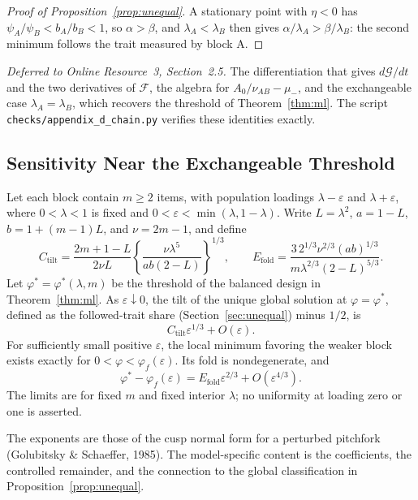 \begin{proof}[Proof of Proposition~\ref{prop:unequal}]
A stationary point with $\eta<0$ has $\psi_A/\psi_B<b_A/b_B<1$, so $\alpha>\beta$, and $\lambda_A<\lambda_B$ then gives $\alpha/\lambda_A>\beta/\lambda_B$: the second minimum follows the trait measured by block A.
\end{proof}

\textit{Deferred to Online Resource~3, Section~2.5.} The differentiation that gives $d\mathcal G/dt$ and the two derivatives of $\mathcal F$, the algebra for $A_0/\nu_{AB}-\mu_-$, and the exchangeable case $\lambda_A=\lambda_B$, which recovers the threshold of Theorem~\ref{thm:ml}. The script \texttt{checks/appendix\_d\_chain.py} verifies these identities exactly.

\subsection{Sensitivity Near the Exchangeable Threshold}
\label{app:cusp}

\begin{theorem}
\label{thm:cusp}
Let each block contain $m\ge2$ items, with population loadings $\lambda-\varepsilon$ and $\lambda+\varepsilon$, where $0<\lambda<1$ is fixed and $0<\varepsilon<\min(\lambda,1-\lambda)$. Write $L=\lambda^2$, $a=1-L$, $b=1+(m-1)L$, and $\nu =2m-1$, and define
\[
C_{\mathrm{tilt}}=\frac{2m+1-L}{2\nu L}
\left\{\frac{\nu \lambda^5}{ab(2-L)}\right\}^{1/3},
\qquad
E_{\mathrm{fold}}=\frac{3\,2^{1/3}\nu ^{2/3}(ab)^{1/3}}
{m\lambda^{2/3}(2-L)^{5/3}}.
\]
Let $\varphi^*=\varphi^*(\lambda,m)$ be the threshold of the balanced design in Theorem~\ref{thm:ml}. As $\varepsilon\downarrow0$, the tilt of the unique global solution at $\varphi=\varphi^*$, defined as the followed-trait share (Section~\ref{sec:unequal}) minus $1/2$, is
\[
C_{\mathrm{tilt}}\varepsilon^{1/3}+O(\varepsilon).
\]
For sufficiently small positive $\varepsilon$, the local minimum favoring the weaker block exists exactly for $0<\varphi<\varphi_f(\varepsilon)$. Its fold is nondegenerate, and
\[
\varphi^*-\varphi_f(\varepsilon)
=E_{\mathrm{fold}}\varepsilon^{2/3}+O(\varepsilon^{4/3}).
\]
The limits are for fixed $m$ and fixed interior $\lambda$; no uniformity at loading zero or one is asserted.

\end{theorem}

The exponents are those of the cusp normal form for a perturbed pitchfork (Golubitsky \& Schaeffer, 1985). The model-specific content is the coefficients, the controlled remainder, and the connection to the global classification in Proposition~\ref{prop:unequal}.

